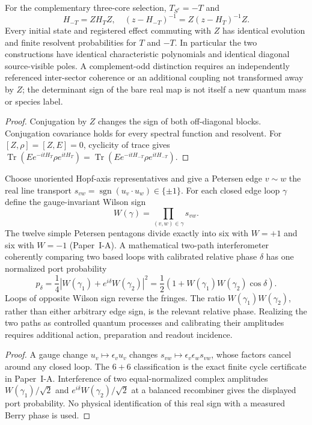 \documentclass[12pt,a4paper]{article}
\begin{document}
\begin{corollary}
\label{p4b:cor:v320-complement-phase-gauge}
For the complementary three-core selection, $T_{S^c}=-T$ and
\[
 H_{-T}=ZH_TZ,
 \quad (z-H_{-T})^{-1}=Z(z-H_T)^{-1}Z.
\]
Every initial state and registered effect commuting with $Z$ has
identical evolution and finite resolvent probabilities for $T$ and
$-T$. In particular the two constructions have identical characteristic
polynomials and identical diagonal source-visible poles. A
complement-odd distinction requires an independently referenced
inter-sector coherence or an additional coupling not transformed
away by $Z$; the determinant sign of the bare real map is not itself
a new quantum mass or species label.
\end{corollary}
\begin{proof}
Conjugation by $Z$ changes the sign of both off-diagonal blocks.
Conjugation covariance holds for every spectral function and
resolvent. For $[Z,\rho]=[Z,E]=0$, cyclicity of trace gives
$\operatorname{Tr}(E e^{-itH_T}\rho e^{itH_T})
=\operatorname{Tr}(E e^{-itH_{-T}}\rho e^{itH_{-T}})$.
\end{proof}

\begin{theorem}
\label{p4b:thm:v320-z2-loop-interference}
Choose unoriented Hopf-axis representatives and give a Petersen
edge $v\sim w$ the real line transport
$s_{vw}=\operatorname{sgn}(u_v\cdot u_w)\in\{\pm1\}$.
For each closed edge loop $\gamma$ define the gauge-invariant
Wilson sign
\[
 W(\gamma)=\prod_{(v,w)\in\gamma}s_{vw}.
\]
The twelve simple Petersen pentagons divide exactly into six with
$W=+1$ and six with $W=-1$ (Paper~I-A). A mathematical two-path
interferometer coherently comparing two based loops with calibrated
relative phase $\delta$ has one normalized port probability
\[
 \boxed{p_\delta
 =\frac14\left|W(\gamma_1)+e^{i\delta}W(\gamma_2)\right|^2
 =\frac12\left(1+W(\gamma_1)W(\gamma_2)\cos\delta\right).}
\]
Loops of opposite Wilson sign reverse the fringes. The ratio
$W(\gamma_1)W(\gamma_2)$, rather than either arbitrary edge sign, is
the relevant relative phase. Realizing the two paths as controlled
quantum processes and calibrating their amplitudes requires
additional action, preparation and readout incidence.
\end{theorem}
\begin{proof}
A gauge change $u_v\mapsto\epsilon_vu_v$ changes
$s_{vw}\mapsto\epsilon_v\epsilon_ws_{vw}$, whose factors cancel
around any closed loop. The $6+6$ classification is the exact finite
cycle certificate in Paper~I-A. Interference of two equal-normalized
complex amplitudes $W(\gamma_1)/\sqrt2$ and
$e^{i\delta}W(\gamma_2)/\sqrt2$ at a balanced recombiner gives
the displayed port probability. No physical identification of this
real sign with a measured Berry phase is used.
\end{proof}
\end{document}
